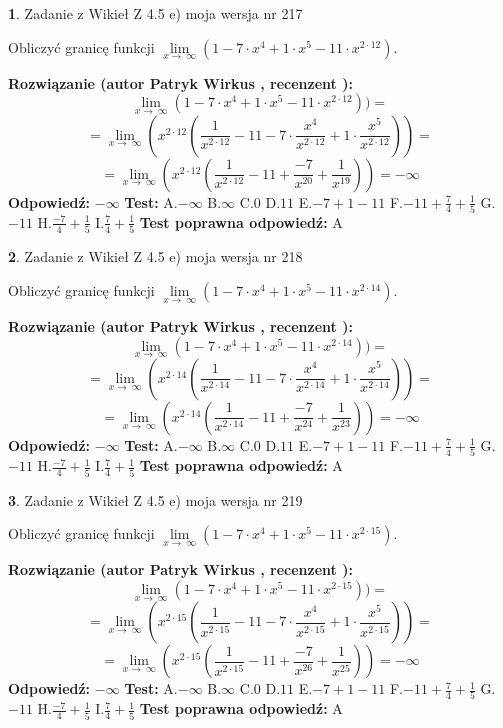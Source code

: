 \documentclass[12pt, a4paper]{article}
\theoremstyle{definition} %
\newtheorem{zad}{}
\newcommand{\zadStart}[1]{\begin{zad}#1\newline}
\newcommand{\zadStop}{\end{zad}}
\newcommand{\rozwStart}[2]{\noindent \textbf{Rozwiązanie (autor #1 , recenzent #2): }\newline}
\newcommand{\rozwStop}{\newline}
\newcommand{\odpStart}{\noindent \textbf{Odpowiedź:}\newline}
\newcommand{\odpStop}{\newline}
\newcommand{\testStart}{\noindent \textbf{Test:}\newline}
\newcommand{\testStop}{\newline}
\newcommand{\kluczStart}{\noindent \textbf{Test poprawna odpowiedź:}\newline}
\newcommand{\kluczStop}{\newline}
\begin{document}
\zadStart{Zadanie z Wikieł Z 4.5 e) moja wersja nr 217}



Obliczyć granicę funkcji  $\lim\limits_{x\to\ \infty}(1 - 7 \cdot x^{4}+1 \cdot x^{5}- 11 \cdot x^{2\cdot12})$.
\zadStop
\rozwStart{Patryk Wirkus}{}
$$\lim\limits_{x\to\ \infty}(1 - 7 \cdot x^{4}+1 \cdot x^{5}- 11 \cdot x^{2\cdot12}))=$$
$$=\lim\limits_{x\to\ \infty}(x^{2\cdot12}(\frac{1}{x^{2\cdot12}}-11 -7 \cdot \frac{x^{4}}{x^{2\cdot12}}+1 \cdot \frac{x^{5}}{x^{2\cdot12}}))=$$
$$=\lim\limits_{x\to\ \infty}(x^{2\cdot12}(\frac{1}{x^{2\cdot12}}-11 + \frac{-7}{x^{20}}+ \frac{1}{x^{19}}))=-\infty$$
\rozwStop
\odpStart
$-\infty$
\odpStop
\testStart
A.$-\infty$ B.$\infty$ C.$0$ D.$11$ E.$-7 + 1 - 11$
F.$-11+\frac{7}{4}+\frac{1}{5}$ G.$-11$
H.$\frac{-7}{4}+\frac{1}{5}$
I.$\frac{7}{4}+\frac{1}{5}$
\testStop
\kluczStart
A
\kluczStop



\zadStart{Zadanie z Wikieł Z 4.5 e) moja wersja nr 218}



Obliczyć granicę funkcji  $\lim\limits_{x\to\ \infty}(1 - 7 \cdot x^{4}+1 \cdot x^{5}- 11 \cdot x^{2\cdot14})$.
\zadStop
\rozwStart{Patryk Wirkus}{}
$$\lim\limits_{x\to\ \infty}(1 - 7 \cdot x^{4}+1 \cdot x^{5}- 11 \cdot x^{2\cdot14}))=$$
$$=\lim\limits_{x\to\ \infty}(x^{2\cdot14}(\frac{1}{x^{2\cdot14}}-11 -7 \cdot \frac{x^{4}}{x^{2\cdot14}}+1 \cdot \frac{x^{5}}{x^{2\cdot14}}))=$$
$$=\lim\limits_{x\to\ \infty}(x^{2\cdot14}(\frac{1}{x^{2\cdot14}}-11 + \frac{-7}{x^{24}}+ \frac{1}{x^{23}}))=-\infty$$
\rozwStop
\odpStart
$-\infty$
\odpStop
\testStart
A.$-\infty$ B.$\infty$ C.$0$ D.$11$ E.$-7 + 1 - 11$
F.$-11+\frac{7}{4}+\frac{1}{5}$ G.$-11$
H.$\frac{-7}{4}+\frac{1}{5}$
I.$\frac{7}{4}+\frac{1}{5}$
\testStop
\kluczStart
A
\kluczStop



\zadStart{Zadanie z Wikieł Z 4.5 e) moja wersja nr 219}



Obliczyć granicę funkcji  $\lim\limits_{x\to\ \infty}(1 - 7 \cdot x^{4}+1 \cdot x^{5}- 11 \cdot x^{2\cdot15})$.
\zadStop
\rozwStart{Patryk Wirkus}{}
$$\lim\limits_{x\to\ \infty}(1 - 7 \cdot x^{4}+1 \cdot x^{5}- 11 \cdot x^{2\cdot15}))=$$
$$=\lim\limits_{x\to\ \infty}(x^{2\cdot15}(\frac{1}{x^{2\cdot15}}-11 -7 \cdot \frac{x^{4}}{x^{2\cdot15}}+1 \cdot \frac{x^{5}}{x^{2\cdot15}}))=$$
$$=\lim\limits_{x\to\ \infty}(x^{2\cdot15}(\frac{1}{x^{2\cdot15}}-11 + \frac{-7}{x^{26}}+ \frac{1}{x^{25}}))=-\infty$$
\rozwStop
\odpStart
$-\infty$
\odpStop
\testStart
A.$-\infty$ B.$\infty$ C.$0$ D.$11$ E.$-7 + 1 - 11$
F.$-11+\frac{7}{4}+\frac{1}{5}$ G.$-11$
H.$\frac{-7}{4}+\frac{1}{5}$
I.$\frac{7}{4}+\frac{1}{5}$
\testStop
\kluczStart
A
\kluczStop
\end{document}
